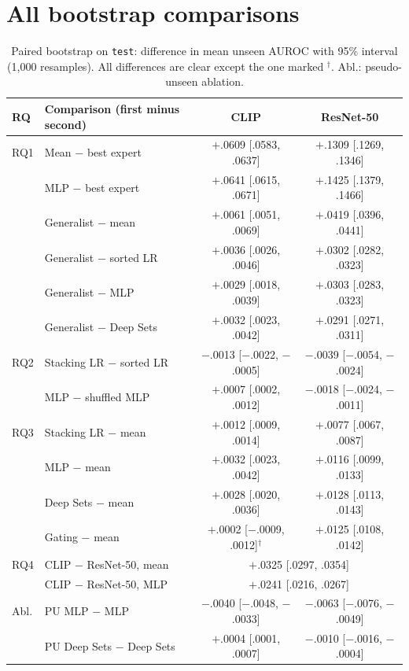 \documentclass[10pt,a4paper]{article}
\begin{document}
\section{All bootstrap comparisons}\label{app:bootstrap}
\begin{table}[H]
\centering
\small
\setlength{\tabcolsep}{4pt}
\begin{tabular}{llcc}
\toprule
RQ & Comparison (first minus second) & CLIP & ResNet-50 \\
\midrule
RQ1 & Mean $-$ best expert & $+$.0609 [.0583, .0637] & $+$.1309 [.1269, .1346] \\
    & MLP $-$ best expert & $+$.0641 [.0615, .0671] & $+$.1425 [.1379, .1466] \\
    & Generalist $-$ mean & $+$.0061 [.0051, .0069] & $+$.0419 [.0396, .0441] \\
    & Generalist $-$ sorted LR & $+$.0036 [.0026, .0046] & $+$.0302 [.0282, .0323] \\
    & Generalist $-$ MLP & $+$.0029 [.0018, .0039] & $+$.0303 [.0283, .0323] \\
    & Generalist $-$ Deep Sets & $+$.0032 [.0023, .0042] & $+$.0291 [.0271, .0311] \\
\midrule
RQ2 & Stacking LR $-$ sorted LR & $-$.0013 [$-$.0022, $-$.0005] & $-$.0039 [$-$.0054, $-$.0024] \\
    & MLP $-$ shuffled MLP & $+$.0007 [.0002, .0012] & $-$.0018 [$-$.0024, $-$.0011] \\
\midrule
RQ3 & Stacking LR $-$ mean & $+$.0012 [.0009, .0014] & $+$.0077 [.0067, .0087] \\
    & MLP $-$ mean & $+$.0032 [.0023, .0042] & $+$.0116 [.0099, .0133] \\
    & Deep Sets $-$ mean & $+$.0028 [.0020, .0036] & $+$.0128 [.0113, .0143] \\
    & Gating $-$ mean & $+$.0002 [$-$.0009, .0012]$^\dagger$ & $+$.0125 [.0108, .0142] \\
\midrule
RQ4 & CLIP $-$ ResNet-50, mean & \multicolumn{2}{c}{$+$.0325 [.0297, .0354]} \\
    & CLIP $-$ ResNet-50, MLP & \multicolumn{2}{c}{$+$.0241 [.0216, .0267]} \\
\midrule
Abl. & PU MLP $-$ MLP & $-$.0040 [$-$.0048, $-$.0033] & $-$.0063 [$-$.0076, $-$.0049] \\
    & PU Deep Sets $-$ Deep Sets & $+$.0004 [.0001, .0007] & $-$.0010 [$-$.0016, $-$.0004] \\
\bottomrule
\end{tabular}
\caption{Paired bootstrap on \texttt{test}: difference in mean unseen AUROC with 95\% interval (1,000 resamples). All differences are clear except the one marked $^\dagger$. Abl.: pseudo-unseen ablation.}
\label{tab:bootstrap-full}
\end{table}
\end{document}

